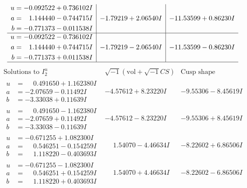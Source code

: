 \documentclass[1p]{elsarticle_modified}
\theoremstyle{definition}
\newcommand{\I}{\sqrt{-1}}
\begin{document}
$$\begin{array}{c|c|c}
\begin{aligned}
u &= -0.092522 + 0.736102 I \\
a &= \phantom{-}1.144440 - 0.744715 I \\
b &= -0.771373 - 0.011538 I\end{aligned}
 & -1.79219 + 2.06540 I & -11.53599 + 0.86230 I \\ \hline\begin{aligned}
u &= -0.092522 - 0.736102 I \\
a &= \phantom{-}1.144440 + 0.744715 I \\
b &= -0.771373 + 0.011538 I\end{aligned}
 & -1.79219 - 2.06540 I & -11.53599 - 0.86230 I\\
 \hline 
 \end{array}$$\newpage$$\begin{array}{c|c|c}  
\text{Solutions to }I^u_{2}& \I (\text{vol} + \sqrt{-1}CS) & \text{Cusp shape}\\
 \hline 
\begin{aligned}
u &= \phantom{-}0.491650 + 1.162380 I \\
a &= -2.07659 - 0.11492 I \\
b &= -3.33038 + 0.11639 I\end{aligned}
 & -4.57612 + 8.23220 I & -9.55306 - 8.45619 I \\ \hline\begin{aligned}
u &= \phantom{-}0.491650 - 1.162380 I \\
a &= -2.07659 + 0.11492 I \\
b &= -3.33038 - 0.11639 I\end{aligned}
 & -4.57612 - 8.23220 I & -9.55306 + 8.45619 I \\ \hline\begin{aligned}
u &= -0.671255 + 1.082300 I \\
a &= \phantom{-}0.546251 - 0.154259 I \\
b &= \phantom{-}1.118220 - 0.403693 I\end{aligned}
 & \phantom{-}1.54070 - 4.46634 I & -8.22602 + 6.86506 I \\ \hline\begin{aligned}
u &= -0.671255 - 1.082300 I \\
a &= \phantom{-}0.546251 + 0.154259 I \\
b &= \phantom{-}1.118220 + 0.403693 I\end{aligned}
 & \phantom{-}1.54070 + 4.46634 I & -8.22602 - 6.86506 I \\ \hline\begin{aligned}

\end{aligned}
\end{array}$$
\end{document}
